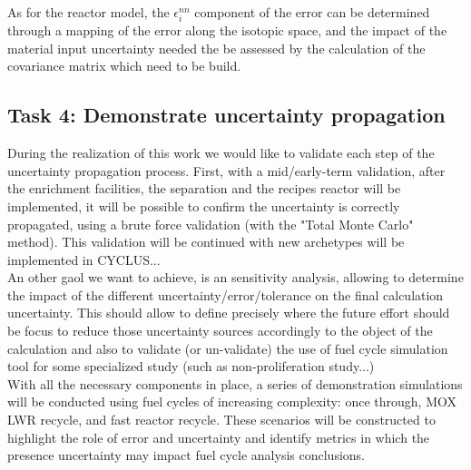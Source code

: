 \documentclass[dvips,12pt]{article}
\begin{document}
 As for the reactor model, the $\epsilon^{nn}_{i}$
 component of the error can be determined through
 a mapping of the error along the isotopic space,
 and the impact of the material input uncertainty
 needed the be assessed by the calculation of the
 covariance matrix which need to be build.

\subsection{Task 4: Demonstrate uncertainty propagation}
During the realization of this work we would like
to validate each step of the uncertainty
propagation process. First, with a mid/early-term
validation, after the enrichment facilities, the
separation and the recipes reactor will be
implemented, it will be possible to confirm the
uncertainty is correctly propagated, using a brute
force validation (with the "Total Monte Carlo"
method). This validation will be continued with
new archetypes will be implemented in CYCLUS...\\
An other gaol we want to achieve, is an
sensitivity analysis, allowing to determine the
impact of the different
uncertainty/error/tolerance on the final
calculation uncertainty. This should allow to
define precisely where the future effort should be
focus to reduce those uncertainty sources
accordingly to the object of the calculation and
also to validate (or un-validate) the use of fuel
cycle simulation tool for some specialized study
(such as non-proliferation study...)\\
With all the necessary components in place, a
series of demonstration simulations will be
conducted using fuel cycles of increasing
complexity: once through, MOX LWR recycle, and
fast reactor recycle.  These scenarios will be
constructed to highlight the role of error and
uncertainty and identify metrics in which the
presence uncertainty may impact fuel cycle
analysis conclusions.



\end{document}
